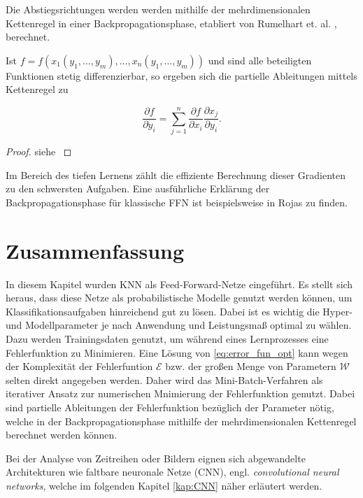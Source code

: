 Die Abstiegsrichtungen werden werden mithilfe der mehrdimensionalen Kettenregel in einer Backpropagationsphase, etabliert von Rumelhart et. al. \cite{MLPbook}, berechnet.
\begin{satz}
    \label{chainrule}
    Ist $f=f(x_1(y_1, \ldots, y_m), \ldots, x_n(y_1, \ldots, y_m))$ und sind alle beteiligten Funktionen stetig differenzierbar, so ergeben sich die partielle Ableitungen mittels Kettenregel zu

    \begin{equation*}
        \frac{\partial f}{\partial y_i}=\sum_{j=1}^n \frac{\partial f}{\partial x_i} \frac{\partial x_j}{\partial y_i} .
    \end{equation*}
\end{satz}

\begin{proof}
    siehe \cite{forster2017analysis}
\end{proof}
Im Bereich des tiefen Lernens zählt die effiziente Berechnung dieser Gradienten zu den schwersten Aufgaben. Eine ausführliche Erklärung der Backpropagationsphase für klassische FFN ist beispielsweise in Rojas\cite{rojas96neural} zu finden. 

\section{Zusammenfassung}
\label{abs:NN_conc}
In diesem Kapitel wurden KNN als Feed-Forward-Netze eingeführt. Es stellt sich heraus, dass diese Netze als probabilistische Modelle genutzt werden können, um Klassifikationsaufgaben hinreichend gut zu lösen. Dabei ist es wichtig die Hyper- und Modellparameter je nach Anwendung und Leistungsmaß optimal zu wählen. Dazu werden Trainingsdaten genutzt, um während eines Lernprozesses eine Fehlerfunktion zu Minimieren. Eine Lösung von \ref{eq:error_fun_opt} kann wegen der Komplexität der Fehlerfuntion $\mathcal{E}$ bzw. der großen Menge von Parametern $\mathcal{W}$ selten direkt angegeben werden\cite{blum1992training}. Daher wird das Mini-Batch-Verfahren als iterativer Ansatz zur numerischen Mnimierung der Fehlerfunktion genutzt. Dabei sind partielle Ableitungen der Fehlerfunktion bezüglich der Parameter nötig, welche in der Backpropagationsphase mithilfe der mehrdimensionalen Kettenregel berechnet werden können. 

Bei der Analyse von Zeitreihen oder Bildern eignen sich abgewandelte Architekturen wie faltbare neuronale Netze (CNN), engl. \textit{convolutional neural networks}, welche im folgenden Kapitel \ref{kap:CNN} näher erläutert werden.


    





